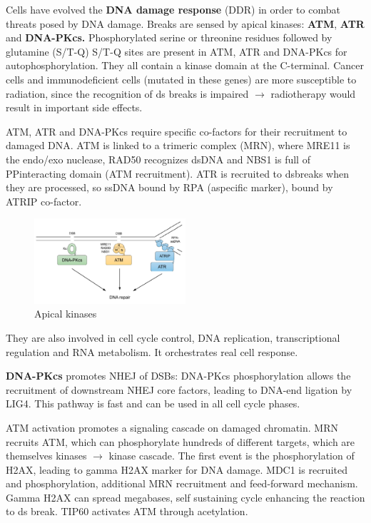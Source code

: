 Cells have evolved the \textbf{DNA damage response} (DDR) in order to combat threats
posed by DNA damage. Breaks are sensed by apical kinases: \textbf{ATM}, \textbf{ATR} and \textbf{DNA-PKcs.} Phosphorylated serine or threonine residues followed by glutamine (S/T-Q) S/T-Q sites are present in ATM, ATR and DNA-PKcs for autophosphorylation. They all contain a kinase domain at the C-terminal. Cancer cells and immunodeficient cells (mutated in these genes) are more susceptible to radiation, since the recognition of ds breaks is impaired $\rightarrow$ radiotherapy would result in important side effects.

ATM, ATR and DNA-PKcs require specific co-factors for their recruitment to
damaged DNA. ATM is linked to a trimeric complex (MRN), where MRE11 is the endo/exo nuclease, RAD50 recognizes dsDNA and NBS1 is full of PPinteracting domain (ATM recruitment). ATR is recruited to dsbreaks when they are processed, so ssDNA bound by RPA (aspecific marker), bound by ATRIP co-factor.

\begin{figure}
\centering
\includegraphics[width=0.5\textwidth]{../_resources/Screen_Shot_2022-11-30_at_09-11-05.png}
\caption{Apical kinases}
\end{figure}

They are also involved in cell cycle control, DNA replication, transcriptional regulation and RNA metabolism. It orchestrates real cell response.

\textbf{DNA-PKcs} promotes NHEJ of DSBs: DNA-PKcs phosphorylation allows the recruitment of downstream NHEJ core factors, leading to DNA-end ligation by LIG4. This pathway is fast and can be used in all cell cycle phases.

ATM activation promotes a signaling cascade on damaged chromatin. MRN recruits ATM, which can phosphorylate hundreds of different targets, which are themselves kinases $\rightarrow$ kinase cascade. The first event is the phosphorylation of H2AX, leading to gamma H2AX marker for DNA damage. MDC1 is recruited and phosphorylation, additional MRN recruitment and feed-forward mechanism. Gamma H2AX can spread megabases, self sustaining cycle enhancing the reaction to ds break. TIP60 activates ATM through acetylation.

